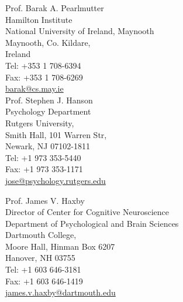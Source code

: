 \documentclass[12pt,overlapped,line]{res}
\begin{document}
\begin{resume}
 \vspace{0em}
  \begin{multicols}{2}
 {\small
    Prof. Barak A. Pearlmutter \\
    Hamilton Institute \\
    National University of Ireland, Maynooth \\
    Maynooth, Co. Kildare, \\
    Ireland \\
    Tel: +353 1 708-6394\\
    Fax: +353 1 708-6269\\
    \url{barak@cs.may.ie} \\
    Prof. Stephen J. Hanson \\
    Psychology Department \\
    Rutgers University, \\
    Smith Hall, 101 Warren Str, \\
    Newark, NJ 07102-1811 \\
    Tel: +1 973 353-5440 \\
    Fax: +1 973 353-1171 \\
    \url{jose@psychology.rutgers.edu}
 }
 \end{multicols}
\vspace{-1em}
{\small
Prof. James V. Haxby \\
Director of Center for Cognitive Neuroscience \\
Department of Psychological and Brain Sciences \\
Dartmouth College, \\
Moore Hall, Hinman Box 6207 \\
Hanover, NH 03755 \\
Tel: +1 603 646-3181 \\
Fax: +1 603 646-1419 \\
\url{james.v.haxby@dartmouth.edu} \\
}



\end{resume}
\end{document}
